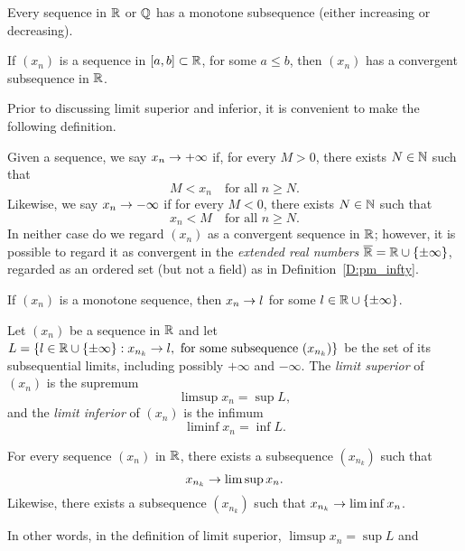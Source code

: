 \documentclass{book}
\begin{document}
\begin{thm}
Every sequence in $\mathbb{R}$ or $\mathbb{Q}$ has a monotone subsequence (either increasing or decreasing).
\label{T:monotone_subseq}
\end{thm}

\begin{cor}
If $(x_n)$ is a sequence in $[a,b] \subset \mathbb{R}$, for some $a \leq b$, then
$(x_n)$ has a convergent subsequence in $\mathbb{R}$.
\label{C:mini-HB}
\end{cor}


Prior to discussing limit superior and inferior, it is convenient to make the following definition. 
\begin{defn}
Given a sequence, we say $x_n \rightarrow +\infty$ if, for every $M > 0$, there exists $N \in \mathbb{N}$ such that
\[
	M < x_n \quad \text{for all $n \geq N$}.
\]
Likewise, we say $x_n \rightarrow - \infty$ if for every $M < 0$, there exists $N \in \mathbb{N}$ such that
\[
	x_n < M \quad \text{for all $n \geq N$}.
\]
In neither case do we regard $(x_n)$ as a convergent sequence in $\mathbb{R}$;
however, it is possible to regard it as convergent in the {\em extended real
numbers} $\overline{\mathbb{R}} = \mathbb{R} \cup \left\{ \pm \infty \right\}$, regarded as an ordered set
(but not a field) as in Definition~\ref{D:pm_infty}.
\label{D:lim_pm_infty}
\end{defn}

\begin{propstar}
If $(x_n)$ is a monotone sequence, then $x_n \rightarrow l$ for some $l \in \mathbb{R} \cup \left\{ \pm \infty \right\}$.
\label{P:monotone_extended_converges}
\end{propstar}


\begin{defn}
Let $(x_n)$ be a sequence in $\mathbb{R}$ and let $L = \left\{  l \in \mathbb{R} \cup \left\{ \pm
\infty \right\} : x_{n_k} \rightarrow l, \text{ for some subsequence $(x_{n_k})$} \right\}$ be the
set of its subsequential limits, including possibly $+\infty$ and $-\infty$.
The {\em limit superior} of $(x_n)$ is the supremum 
\[
	\limsup x_n = \sup L,
\]
and the {\em limit inferior} of $(x_n)$ is the infimum
\[
	\liminf x_n = \inf L.
\]
\label{D:limsup}
\end{defn}

\begin{prop}
For every sequence $(x_n)$ in $\mathbb{R}$, there exists a subsequence $(x_{n_k})$ such that
\[
	x_{n_k} \rightarrow \limsup x_n.
\]
Likewise, there exists a subsequence $(x_{n_k})$ such that $x_{n_k} \rightarrow \liminf x_n$.

In other words, in the definition of limit superior, $\limsup x_n = \sup L$ and

\label{P:limsup_subseq}
\end{prop}
\end{document}
